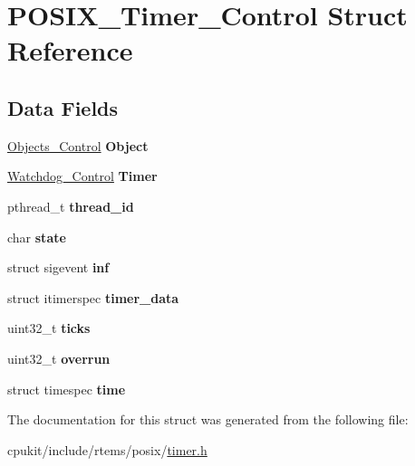 \hypertarget{structPOSIX__Timer__Control}{}\section{P\+O\+S\+I\+X\+\_\+\+Timer\+\_\+\+Control Struct Reference}
\label{structPOSIX__Timer__Control}
\subsection*{Data Fields}
\begin{DoxyCompactItemize}
\item 
\mbox{\label{structPOSIX__Timer__Control_ad3fa10a2fe6aea58deb921882d236cb6}} 
\mbox{\hyperlink{structObjects__Control}{Objects\+\_\+\+Control}} {\bfseries Object}
\item 
\mbox{\label{structPOSIX__Timer__Control_adabb8619571119312ce788bc5edf3e27}} 
\mbox{\hyperlink{structWatchdog__Control}{Watchdog\+\_\+\+Control}} {\bfseries Timer}
\item 
\mbox{\label{structPOSIX__Timer__Control_a9671edcd565f8b052c21005de84489af}} 
pthread\+\_\+t {\bfseries thread\+\_\+id}
\item 
\mbox{\label{structPOSIX__Timer__Control_aec76211a07b886491d29013b0367d89e}} 
char {\bfseries state}
\item 
\mbox{\label{structPOSIX__Timer__Control_a7a9b9eda67533d5fda89631b5ea4dd2a}} 
struct sigevent {\bfseries inf}
\item 
\mbox{\label{structPOSIX__Timer__Control_a509db14d8984463c714faca80509566f}} 
struct itimerspec {\bfseries timer\+\_\+data}
\item 
\mbox{\label{structPOSIX__Timer__Control_a46a640934db859a352608e1f05e5a75d}} 
uint32\+\_\+t {\bfseries ticks}
\item 
\mbox{\label{structPOSIX__Timer__Control_a9c7679bac77fa9ba7e533018fbca1589}} 
uint32\+\_\+t {\bfseries overrun}
\item 
\mbox{\label{structPOSIX__Timer__Control_a56c5fea49a1bf9b522dd12b9169f9617}} 
struct timespec {\bfseries time}
\end{DoxyCompactItemize}


The documentation for this struct was generated from the following file\+:\begin{DoxyCompactItemize}
\item 
cpukit/include/rtems/posix/\mbox{\hyperlink{cpukit_2include_2rtems_2posix_2timer_8h}{timer.\+h}}\end{DoxyCompactItemize}
